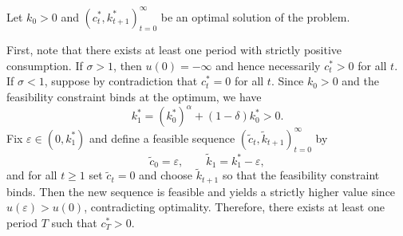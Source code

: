 Let $k_0 >0$ and $(c_t^*,k_{t+1}^*)_{t=0}^{\infty}$ be an optimal solution of the problem.

First, note that there exists at least one period with strictly positive consumption. If $\sigma > 1$, then $u(0)=-\infty$ and hence necessarily $c_t^*>0$ for all $t$. If $\sigma < 1$, suppose by contradiction that $c_t^*=0$ for all $t$. Since $k_0>0$ and the feasibility constraint binds at the optimum, we have
\[
k_1^* = (k_0^*)^\alpha + (1-\delta)k_0^* > 0.
\]
Fix $\varepsilon \in (0,k_1^*)$ and define a feasible sequence $(\tilde c_t,\tilde k_{t+1})_{t=0}^\infty$ by
\[
\tilde c_0=\varepsilon,\qquad \tilde k_1 = k_1^*-\varepsilon,
\]
and for all $t\ge 1$ set $\tilde c_t=0$ and choose $\tilde k_{t+1}$ so that the feasibility constraint binds. Then the new sequence is feasible and yields a strictly higher value since $u(\varepsilon)>u(0)$, contradicting optimality. Therefore, there exists at least one period $T$ such that $c_T^*>0$. \\

